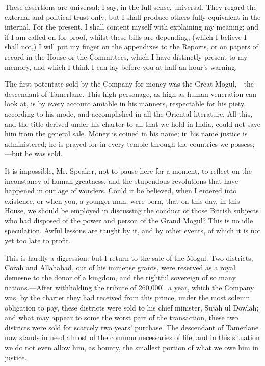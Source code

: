 These assertions are universal: I say, in the full sense, universal. They regard the external and political trust only; but I shall produce others fully equivalent in the internal. For the present, I shall content myself with explaining my meaning; and if I am called on for proof, whilst these bills are depending, (which I believe I shall not,) I will put my finger on the appendixes to the Reports, or on papers of record in the House or the Committees, which I have distinctly present to my memory, and which I think I can lay before you at half an hour's warning.

The first potentate sold by the Company for money was the Great Mogul,—the descendant of Tamerlane. This high personage, as high as human veneration can look at, is by every account amiable in his manners, respectable for his piety, according to his mode, and accomplished in all the Oriental literature. All this, and the title derived under his charter to all that we hold in India, could not save him from the general sale. Money is coined in his name; in his name justice is administered; he is prayed for in every temple through the countries we possess;—but he was sold.

It is impossible, Mr. Speaker, not to pause here for a moment, to reflect on the inconstancy of human greatness, and the stupendous revolutions that have happened in our age of wonders. Could it be believed, when I entered into existence, or when you, a younger man, were born, that on this day, in this House, we should be employed in discussing the conduct of those British subjects who had disposed of the power and person of the Grand Mogul? This is no idle speculation. Awful lessons are taught by it, and by other events, of which it is not yet too late to profit.

This is hardly a digression: but I return to the sale of the Mogul. Two districts, Corah and Allahabad, out of his immense grants, were reserved as a royal demesne to the donor of a kingdom, and the rightful sovereign of so many nations.—After withholding the tribute of 260,000l. a year, which the Company was, by the charter they had received from this prince, under the most solemn obligation to pay, these districts were sold to his chief minister, Sujah ul Dowlah; and what may appear to some the worst part of the transaction, these two districts were sold for scarcely two years' purchase. The descendant of Tamerlane now stands in need almost of the common necessaries of life; and in this situation we do not even allow him, as bounty, the smallest portion of what we owe him in justice.

